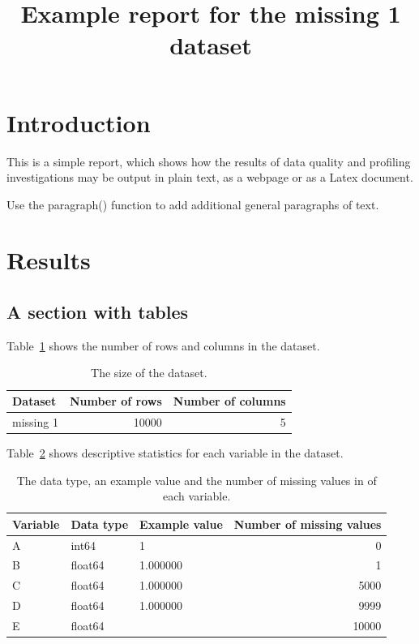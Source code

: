 \documentclass{article}
\title{Example report for the missing 1 dataset}
\begin{document}
\maketitle

\section{Introduction}

This is a simple report, which shows how the results of data quality and profiling investigations may be output in plain text, as a webpage or as a Latex document.

Use the paragraph() function to add additional general paragraphs of text.

\section{Results}

\subsection{A section with tables}

Table~\ref{tab:1} shows the number of rows and columns in the dataset.

\begin{table}[h!]
\caption{The size of the dataset.}
\label{tab:1}
\begin{tabular}{lrr}
\toprule
Dataset & Number of rows & Number of columns \\
\midrule
missing 1 & 10000 & 5 \\
\bottomrule
\end{tabular}
\end{table}

Table~\ref{tab:2} shows descriptive statistics for each variable in the dataset.

\begin{table}[h!]
\caption{The data type, an example value and the number of missing values in of each variable.}
\label{tab:2}
\begin{tabular}{lllr}
\toprule
Variable & Data type & Example value & Number of missing values \\
\midrule
A & int64 & 1 & 0 \\
B & float64 & 1.000000 & 1 \\
C & float64 & 1.000000 & 5000 \\
D & float64 & 1.000000 & 9999 \\
E & float64 &  & 10000 \\
\bottomrule
\end{tabular}
\end{table}
\end{document}
